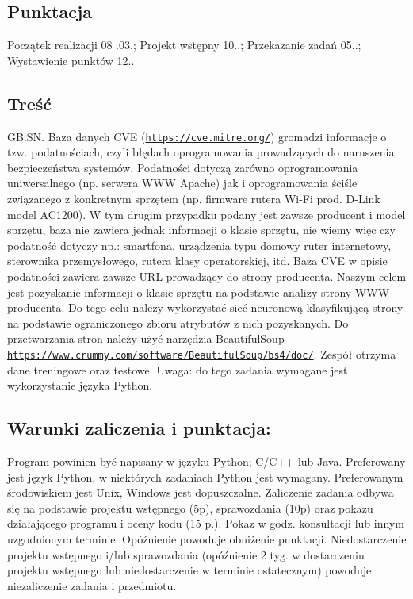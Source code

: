 \subsection*{Punktacja}

Początek realizacji 08 .03.; Projekt wstępny 10..; Przekazanie zadań 05..; Wystawienie punktów 12..

\subsection*{Treść}

G\+B.\+S\+N. Baza danych C\+VE (\href{https://cve.mitre.org/}{\tt https\+://cve.\+mitre.\+org/}) gromadzi informacje o tzw. podatnościach, czyli błędach oprogramowania prowadzących do naruszenia bezpieczeństwa systemów. Podatności dotyczą zarówno oprogramowania uniwersalnego (np. serwera W\+WW Apache) jak i oprogramowania ściśle związanego z konkretnym sprzętem (np. firmware rutera Wi-\/\+Fi prod. D-\/\+Link model A\+C1200). W tym drugim przypadku podany jest zawsze producent i model sprzętu, baza nie zawiera jednak informacji o klasie sprzętu, nie wiemy więc czy podatność dotyczy np.\+: smartfona, urządzenia typu domowy ruter internetowy, sterownika przemysłowego, rutera klasy operatorskiej, itd. Baza C\+VE w opisie podatności zawiera zawsze U\+RL prowadzący do strony producenta. Naszym celem jest pozyskanie informacji o klasie sprzętu na podstawie analizy strony W\+WW producenta. Do tego celu należy wykorzystać sieć neuronową klasyfikującą strony na podstawie ograniczonego zbioru atrybutów z nich pozyskanych. Do przetwarzania stron należy użyć narzędzia Beautiful\+Soup – \href{https://www.crummy.com/software/BeautifulSoup/bs4/doc/}{\tt https\+://www.\+crummy.\+com/software/\+Beautiful\+Soup/bs4/doc/}. Zespół otrzyma dane treningowe oraz testowe. Uwaga\+: do tego zadania wymagane jest wykorzystanie języka Python.

\subsection*{Warunki zaliczenia i punktacja\+:}

Program powinien być napisany w języku Python; C/\+C++ lub Java. Preferowany jest język Python, w niektórych zadaniach Python jest wymagany. Preferowanym środowiskiem jest Unix, Windows jest dopuszczalne. Zaliczenie zadania odbywa się na podstawie projektu wstępnego (5p), sprawozdania (10p) oraz pokazu działającego programu i oceny kodu (15 p.). Pokaz w godz. konsultacji lub innym uzgodnionym terminie. Opóźnienie powoduje obniżenie punktacji. Niedostarczenie projektu wstępnego i/lub sprawozdania (opóźnienie 2 tyg. w dostarczeniu projektu wstępnego lub niedostarczenie w terminie ostatecznym) powoduje niezaliczenie zadania i przedmiotu.

